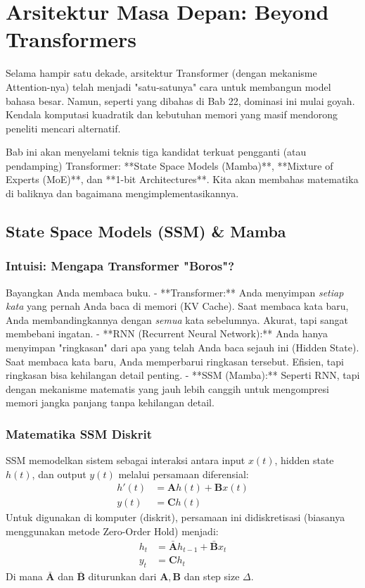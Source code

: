 \chapter{Arsitektur Masa Depan: Beyond Transformers}
\label{chap:future_arch}

Selama hampir satu dekade, arsitektur Transformer (dengan mekanisme Attention-nya) telah menjadi "satu-satunya" cara untuk membangun model bahasa besar. Namun, seperti yang dibahas di Bab 22, dominasi ini mulai goyah. Kendala komputasi kuadratik dan kebutuhan memori yang masif mendorong peneliti mencari alternatif.

Bab ini akan menyelami teknis tiga kandidat terkuat pengganti (atau pendamping) Transformer: **State Space Models (Mamba)**, **Mixture of Experts (MoE)**, dan **1-bit Architectures**. Kita akan membahas matematika di baliknya dan bagaimana mengimplementasikannya.

\section{State Space Models (SSM) \& Mamba}

\subsection{Intuisi: Mengapa Transformer "Boros"?}
Bayangkan Anda membaca buku.
- **Transformer:** Anda menyimpan \textit{setiap kata} yang pernah Anda baca di memori (KV Cache). Saat membaca kata baru, Anda membandingkannya dengan \textit{semua} kata sebelumnya. Akurat, tapi sangat membebani ingatan.
- **RNN (Recurrent Neural Network):** Anda hanya menyimpan "ringkasan" dari apa yang telah Anda baca sejauh ini (Hidden State). Saat membaca kata baru, Anda memperbarui ringkasan tersebut. Efisien, tapi ringkasan bisa kehilangan detail penting.
- **SSM (Mamba):** Seperti RNN, tapi dengan mekanisme matematis yang jauh lebih canggih untuk mengompresi memori jangka panjang tanpa kehilangan detail.

\subsection{Matematika SSM Diskrit}
SSM memodelkan sistem sebagai interaksi antara input $x(t)$, hidden state $h(t)$, dan output $y(t)$ melalui persamaan diferensial:
\begin{align}
h'(t) &= \mathbf{A}h(t) + \mathbf{B}x(t) \\
y(t) &= \mathbf{C}h(t)
\end{align}
Untuk digunakan di komputer (diskrit), persamaan ini didiskretisasi (biasanya menggunakan metode Zero-Order Hold) menjadi:
\begin{align}
h_t &= \bar{\mathbf{A}} h_{t-1} + \bar{\mathbf{B}} x_t \\
y_t &= \mathbf{C} h_t
\end{align}
Di mana $\bar{\mathbf{A}}$ dan $\bar{\mathbf{B}}$ diturunkan dari $\mathbf{A}, \mathbf{B}$ dan step size $\Delta$.


